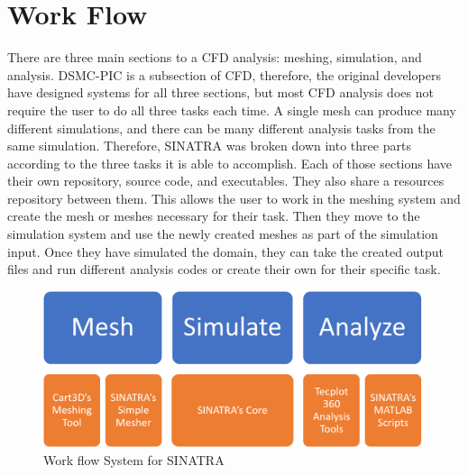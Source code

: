 \section{Work Flow}
There are three main sections to a CFD analysis: meshing, simulation, and analysis. DSMC-PIC is a subsection of CFD, therefore, the original developers have designed systems for all three sections, but most CFD analysis does not require the user to do all three tasks each time. A single mesh can produce many different simulations, and there can be many different analysis tasks from the same simulation. Therefore, SINATRA was broken down into three parts according to the three tasks it is able to accomplish. Each of those sections have their own repository, source code, and executables. They also share a resources repository between them. This allows the user to work in the meshing system and create the mesh or meshes necessary for their task. Then they move to the simulation system and use the newly created meshes as part of the simulation input. Once they have simulated the domain, they can take the created output files and run different analysis codes or create their own for their specific task.



\begin{figure}
\includegraphics[width=.95\textwidth]{figures/UserWorkFlow.png}
\centering
\caption{Work flow System for SINATRA}
\label{fig:UserWorkFlow}
\end{figure}

